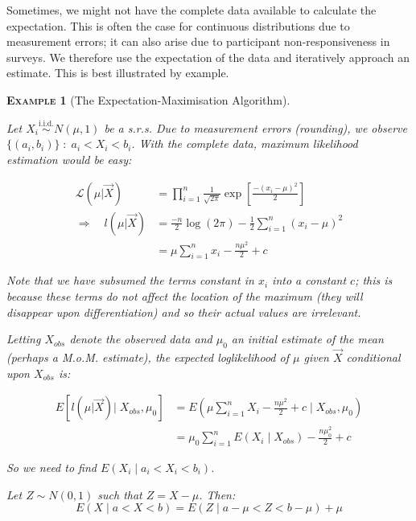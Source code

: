 \documentclass[12pt,a4paper]{article}
\newtheorem{example}{\textsc{Example}}[section]
\begin{document}
Sometimes, we might not have the complete data available to calculate the expectation. This is often the case for continuous distributions due to measurement errors; it can also arise due to participant non-responsiveness in surveys. We therefore use the expectation of the data and iteratively approach an estimate. This is best illustrated by example.

\begin{example}[The Expectation-Maximisation Algorithm]$\;$\par\vspace{1cm}

Let $X_i \overset{\text{i.i.d.}}{\sim} N(\mu, 1)$ be a s.r.s. Due to measurement errors (rounding), we observe $\{(a_i,b_i)\}\; : \; a_i < X_i < b_i$. With the complete data, maximum likelihood estimation would be easy:

\begin{align*}
\mathcal{L}\left(\mu \big| \vec{X}\right) &= \prod_{i=1}^n \frac{1}{\sqrt{2\pi}} \exp\left[\frac{-(x_i-\mu)^2}{2}\right]\\
\Rightarrow\quad l\left(\mu \big| \vec{X}\right) &= \frac{-n}{2} \log(2\pi) - \frac{1}{2} \sum_{i=1}^n (x_i - \mu)^2\\
&= \mu \sum_{i=1}^n x_i - \frac{n \mu^2}{2} + c
\end{align*}

Note that we have subsumed the terms constant in $x_i$ into a constant $c$; this is because these terms do not affect the location of the maximum (they will disappear upon differentiation) and so their actual values are irrelevant.

Letting $X_{obs}$ denote the observed data and $\mu_0$ an initial estimate of the mean (perhaps a M.o.M. estimate), the expected loglikelihood of $\mu$ given $\vec{X}$ conditional upon $X_{obs}$ is:

\begin{align*}
E\left[l\left(\mu | \vec{X}\right) \bigg| \; X_{obs},\mu_0\right] &= E\left(\mu \sum_{i=1}^n X_i - \frac{n\mu^2}{2} + c\;\Bigg|\; X_{obs},\mu_0\right)\\
&= \mu_0 \sum_{i=1}^n E(X_i \mid X_{obs}) - \frac{n\mu_0^2}{2} + c
\end{align*}

So we need to find $E(X_i \mid a_i < X_i < b_i)$.

Let $Z \sim N(0,1)$ such that $Z=X-\mu$. Then:
$$E(X\mid a<X<b) = E(Z \mid a-\mu<Z<b-\mu) + \mu$$


\end{example}
\end{document}
